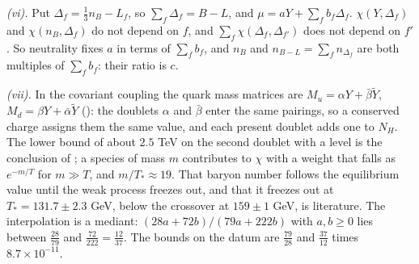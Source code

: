 \emph{(vi).} Put $\Delta_{f} = \tfrac13n_{B} - L_{f}$, so $\sum_{f}\Delta_{f} = B - L$, and $\mu = aY + \sum_{f}b_{f}\Delta_{f}$. $\chi(Y, \Delta_{f})$ and $\chi(n_{B}, \Delta_{f})$ do not depend on $f$, and $\sum_{f}\chi(\Delta_{f}, \Delta_{f'})$ does not depend on $f'$. So neutrality fixes $a$ in terms of $\sum_{f}b_{f}$, and $n_{B}$ and $n_{B-L} = \sum_{f}n_{\Delta_{f}}$ are both multiples of $\sum_{f}b_{f}$: their ratio is $c$.

\emph{(vii).} In the covariant coupling the quark mass matrices are $M_{u} = \alpha Y + \bar{\beta}\tilde{Y}$, $M_{d} = \beta Y + \bar{\alpha}\tilde{Y}$ (): the doublets $\alpha$ and $\bar{\beta}$ enter the same pairings, so a conserved charge assigns them the same value, and each present doublet adds one to $N_{H}$. The lower bound of about $2.5$ TeV on the second doublet with a level is the conclusion of ; a species of mass $m$ contributes to $\chi$ with a weight that falls as $e^{-m/T}$ for $m \gg T$, and $m/T_{*} \approx 19$. That baryon number follows the equilibrium value until the weak process freezes out, and that it freezes out at $T_{*} = 131.7 \pm 2.3$ GeV, below the crossover at $159 \pm 1$ GeV, is literature. The interpolation is a mediant: $(28a + 72b)/(79a + 222b)$ with $a, b \ge 0$ lies between $\tfrac{28}{79}$ and $\tfrac{72}{222} = \tfrac{12}{37}$. The bounds on the datum are $\tfrac{79}{28}$ and $\tfrac{37}{12}$ times $8.7 \times 10^{-11}$.
